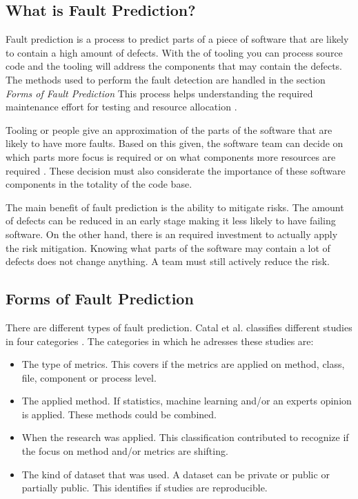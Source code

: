 \subsection*{What is Fault Prediction?}

Fault prediction is a process to predict parts of a piece of software that are likely to contain a high amount of defects.
With the of tooling you can process source code and the tooling will address the components that may contain the defects.
The methods used to perform the fault detection are handled in the section \textit{Forms of Fault Prediction}
This process helps understanding the required maintenance effort for testing and resource allocation \autocite[415]{MAKING_SOFTWARE}.

Tooling or people give an approximation of the parts of the software that are likely to have more faults.
Based on this given, the software team can decide on which parts more focus is required or on what components more resources are required \autocite[415-416]{MAKING_SOFTWARE}.
These decision must also considerate the importance of these software components in the totality of the code base.

The main benefit of fault prediction is the ability to mitigate risks.
The amount of defects can be reduced in an early stage making it less likely to have failing software.
On the other hand, there is an required investment to actually apply the risk mitigation.
Knowing what parts of the software may contain a lot of defects does not change anything.
A team must still actively reduce the risk.

\subsection*{Forms of Fault Prediction}

There are different types of fault prediction. Catal et al. classifies different studies in four categories \autocite{Catal20097346}. The categories in which he adresses these studies are:
\begin{itemize}
\setlength\itemsep{0em}
\item The type of metrics. This covers if the metrics are applied on method, class, file, component or process level.
\item The applied method. If statistics, machine learning and/or an experts opinion is applied. These methods could be combined.
\item When the research was applied. This classification contributed to recognize if the focus on method and/or metrics are shifting.
\item The kind of dataset that was used. A dataset can be private or public or partially public. This identifies if studies are reproducible.
\end{itemize}

